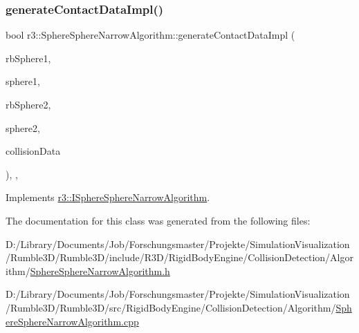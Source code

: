 \subsubsection{\texorpdfstring{generate\+Contact\+Data\+Impl()}{generateContactDataImpl()}}
{\footnotesize\ttfamily bool r3\+::\+Sphere\+Sphere\+Narrow\+Algorithm\+::generate\+Contact\+Data\+Impl (\begin{DoxyParamCaption}\item[{\mbox{\hyperlink{classr3_1_1_rigid_body}{Rigid\+Body}} $\ast$}]{rb\+Sphere1,  }\item[{\mbox{\hyperlink{classr3_1_1_collision_sphere}{Collision\+Sphere}} $\ast$}]{sphere1,  }\item[{\mbox{\hyperlink{classr3_1_1_rigid_body}{Rigid\+Body}} $\ast$}]{rb\+Sphere2,  }\item[{\mbox{\hyperlink{classr3_1_1_collision_sphere}{Collision\+Sphere}} $\ast$}]{sphere2,  }\item[{\mbox{\hyperlink{classr3_1_1_collision_data}{Collision\+Data}} \&}]{collision\+Data }\end{DoxyParamCaption})\hspace{0.3cm}{\ttfamily [override]}, {\ttfamily [protected]}, {\ttfamily [virtual]}}



Implements \mbox{\hyperlink{classr3_1_1_i_sphere_sphere_narrow_algorithm_a9e616d04c7ee379d973ec81ea0067cc3}{r3\+::\+I\+Sphere\+Sphere\+Narrow\+Algorithm}}.



The documentation for this class was generated from the following files\+:\begin{DoxyCompactItemize}
\item 
D\+:/\+Library/\+Documents/\+Job/\+Forschungsmaster/\+Projekte/\+Simulation\+Visualization/\+Rumble3\+D/\+Rumble3\+D/include/\+R3\+D/\+Rigid\+Body\+Engine/\+Collision\+Detection/\+Algorithm/\mbox{\hyperlink{_sphere_sphere_narrow_algorithm_8h}{Sphere\+Sphere\+Narrow\+Algorithm.\+h}}\item 
D\+:/\+Library/\+Documents/\+Job/\+Forschungsmaster/\+Projekte/\+Simulation\+Visualization/\+Rumble3\+D/\+Rumble3\+D/src/\+Rigid\+Body\+Engine/\+Collision\+Detection/\+Algorithm/\mbox{\hyperlink{_sphere_sphere_narrow_algorithm_8cpp}{Sphere\+Sphere\+Narrow\+Algorithm.\+cpp}}\end{DoxyCompactItemize}
